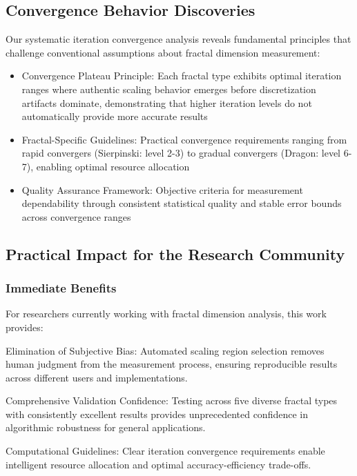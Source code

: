 \documentclass[preprint,12pt]{elsarticle}
\def\textbf#1{#1}%
\begin{document}
\subsection{Convergence Behavior Discoveries}

Our systematic iteration convergence analysis reveals fundamental principles that challenge conventional assumptions about fractal dimension measurement:

\begin{itemize}
\item \textbf{Convergence Plateau Principle}: Each fractal type exhibits optimal iteration ranges where authentic scaling behavior emerges before discretization artifacts dominate, demonstrating that higher iteration levels do not automatically provide more accurate results

\item \textbf{Fractal-Specific Guidelines}: Practical convergence requirements ranging from rapid convergers (Sierpinski: level 2-3) to gradual convergers (Dragon: level 6-7), enabling optimal resource allocation

\item \textbf{Quality Assurance Framework}: Objective criteria for measurement dependability through consistent statistical quality and stable error bounds across convergence ranges
\end{itemize}

\subsection{Practical Impact for the Research Community}

\subsubsection{Immediate Benefits}

For researchers currently working with fractal dimension analysis, this work provides:

\textbf{Elimination of Subjective Bias}: Automated scaling region selection removes human judgment from the measurement process, ensuring reproducible results across different users and implementations.

\textbf{Comprehensive Validation Confidence}: Testing across five diverse fractal types with consistently excellent results provides unprecedented confidence in algorithmic robustness for general applications.

\textbf{Computational Guidelines}: Clear iteration convergence requirements enable intelligent resource allocation and optimal accuracy-efficiency trade-offs.
\end{document}
